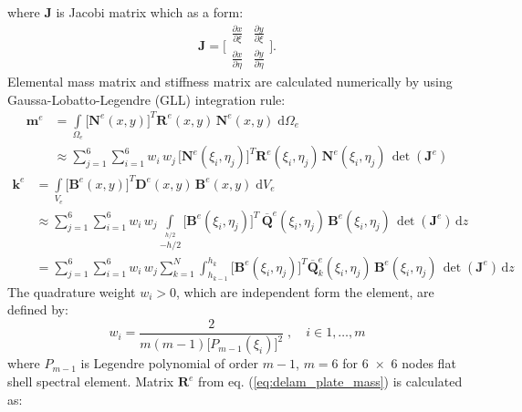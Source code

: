 \documentclass[preprint,12pt]{elsarticle}
\newcommand{\ud}{\mathrm{d}}
\renewcommand{\vec}[1]{\mathbf{#1}}
\renewcommand{\bm}[1]{\mathbf{#1}}
\begin{document}
	where $\vec{J}$ is Jacobi matrix which as a form:
	\begin{equation}
	\vec{J} = \Bigg[ \begin{array}{cc}\frac{\partial x}{\partial \xi}&\frac{\partial y}{\partial \xi}\\[4pt]
	\frac{\partial x}{\partial \eta}&\frac{\partial y}{\partial \eta}\end{array} \Bigg].
	\label{eq:Jacobi2D}
	\end{equation}
	Elemental mass matrix and stiffness matrix are calculated numerically by using Gaussa-Lobatto-Legendre (GLL) integration rule:
	\begin{equation}
	\begin{split}
	\bm{m}^e &= \int \limits_{\Omega_e} \big[\bm{N}^e\!(x,y)\big]^{\!T} \bm{R}^e\!(x,y) \, \bm{N}^e\!(x,y) \; \ud \Omega_e \\
	&	\approx \sum \limits_{j=1}^{6} \sum \limits_{i=1}^{6} w_i\, w_j \, \big[\bm{N}^e\!(\xi_i, \eta_j)\big]^{\!T} \bm{R}^e\!(\xi_i, \eta_j)	\,
	\bm{N}^e\!(\xi_i,\eta_j) \, \det(\vec{J}^e)\label{eq:delam_plate_mass}
	\end{split}
	\end{equation} 
	\begin{equation}
	\begin{split}
	\bm{k}^e &= \int \limits_{V_e} \big[\vec{B}^e\!(x,y)\big]^{\!T} \vec{D}^e \!(x,y)\, \vec{B}^e\!(x,y) \; \ud V_e \\
	& \approx \sum \limits_{j=1}^{6} \sum \limits_{i=1}^{6} w_i\, w_j\! \int \limits_{-h/2}\limits^{h/2} \big[\vec{B}^e\!(\xi_i,\eta_j)\big]^{\!T}\, \bm{\overline Q}^e\!(\xi_i,\eta_j) \, \vec{B}^e\!(\xi_i,\eta_j) \, \det(\vec{J}^e)\, \ud z\\
	&=\sum \limits_{j=1}^{6} \sum \limits_{i=1}^{6} w_i\, w_j \sum \limits_{k=1}^{N} \int_{h_{k-1}}^{h_k} \big[\vec{B}^e\!(\xi_i,\eta_j)\big]^{\!T} \bm{\overline Q}_k^e\!(\xi_i,\eta_j) \, \vec{B}^e\!(\xi_i,\eta_j) \, \det(\vec{J}^e)\, \ud z \label{eq:dealm_plate_stiffness}
	\end{split}
	\end{equation} 
	The quadrature weight $w_i > 0$, which are independent form the element, are defined by:
	\begin{equation}
	w_i = \frac{2}{m(m-1)\big[ P_{m-1}\!(\xi_i) \big]^2}\; , \quad i \in 1,\ldots, m \label{eq:weights}
	\end{equation}
	where $P_{m-1}$ is Legendre polynomial of order $m-1$, $m=6$ for 6~$\times$~6 nodes flat shell spectral element.
	Matrix $\bm{R}^e$ from eq. (\ref{eq:delam_plate_mass}) is calculated as:
\end{document}
